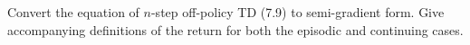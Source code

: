 
\begin{exercise}[Exercise 11.1]

Convert the equation of $n$-step off-policy TD (7.9) to semi-gradient form.
Give accompanying definitions of the return for both the episodic and
continuing cases.

\end{exercise}


\begin{solution}

\phantom{}

\end{solution}

